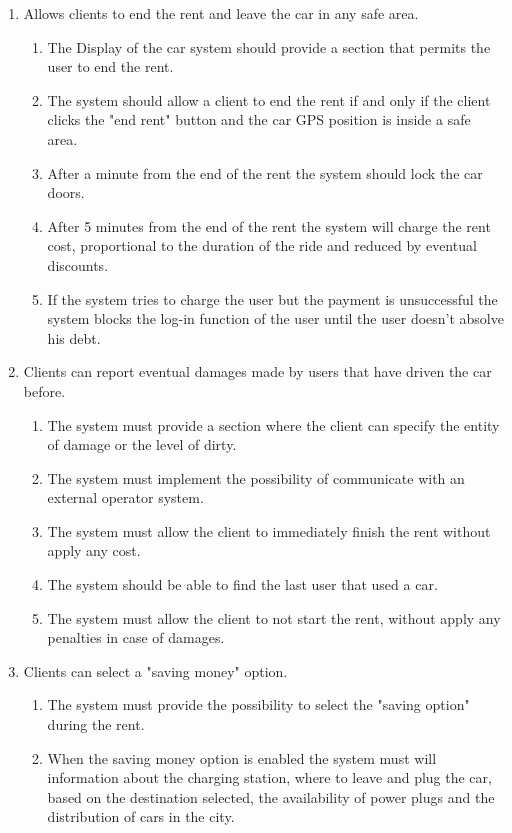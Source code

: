 \begin{enumerate}
\item Allows clients to end the rent and leave the car in any safe area.
\begin{enumerate}
\item The Display of the car system should provide a section that permits the user to end the rent.
\item The system should allow a client to end the rent if and only if the client clicks the "end rent" button and the car GPS position is inside a safe area.
\item After a minute from the end of the rent the system should lock the car doors.
\item After 5 minutes from the end of the rent the system will charge the rent cost, proportional to the duration of the ride and reduced by eventual discounts.
\item If the system tries to charge the user but the payment is unsuccessful the system blocks the log-in function of the user until the user doesn't absolve his debt. 
\end{enumerate}

\item Clients can report eventual damages made by users that have driven the car before.
\begin{enumerate}
\item The system must provide a section where the client can specify the entity of damage or the level of dirty.
\item The system must implement the possibility of communicate with an external operator system.
\item The system must allow the client to immediately finish the rent without apply any cost. 
\item The system should be able to find the last user that used a car.
\item The system must allow the client to not start the rent, without apply any penalties in case of damages.
\end{enumerate}

\item Clients can select a "saving money" option.
\begin{enumerate}
\item The system must provide the possibility to select the "saving option" during the rent.
\item When the saving money option is enabled the system must will information about the charging station, where to leave and plug the car, based on the destination selected, the availability of power plugs and the distribution of cars in the city.
\end{enumerate}
\end{enumerate}

